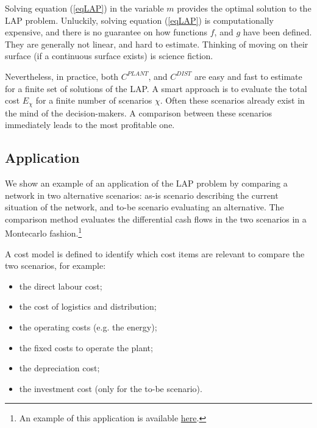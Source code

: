 Solving equation (\ref{eqLAP}) in the variable $m$ provides the optimal solution to the LAP problem. Unluckily, solving equation (\ref{eqLAP}) is computationally expensive, and there is no guarantee on how functions $f$, and $g$ have been defined. They are generally not linear, and hard to estimate. Thinking of moving on their surface (if a continuous surface exists) is science fiction.\par

Nevertheless, in practice, both $C^{PLANT}$, and $C^{DIST}$ are easy and fast to estimate for a finite set of solutions of the LAP. A smart approach is to evaluate the total cost $E_\chi$ for a finite number of scenarios $\chi$. Often these scenarios already exist in the mind of the decision-makers. A comparison between these scenarios immediately leads to the most profitable one.

\subsection{Application}
We show an example of an application of the LAP problem by comparing a network in two alternative scenarios: as-is scenario describing the current situation of the network, and to-be scenario evaluating an alternative. The comparison method evaluates the differential cash flows in the two scenarios in a Montecarlo fashion.\footnote{An example of this application is available \href{https://github.com/aletuf93/logproj/blob/master/examples/DIST_04\%20Location-Allocation\%20problem.ipynb}{here}.}  \par

A cost model is defined to identify which cost items are relevant to compare the two scenarios, for example:

\begin{itemize}
    \item the direct labour cost;
    \item the cost of logistics and distribution;
    \item the operating costs (e.g. the energy);
    \item the fixed costs to operate the plant;
    \item the depreciation cost;
    \item the investment cost (only for the to-be scenario).
\end{itemize}

